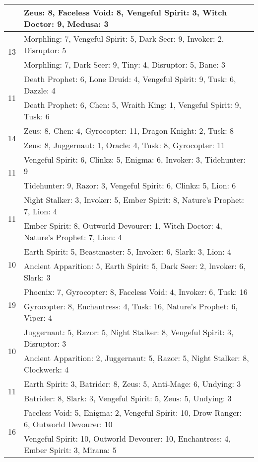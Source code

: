 \documentclass[result.tex]{subfiles}
\begin{document}
\begin{table}[H]
\begin{tabular}{ | c | p{12.5cm} | }
    & Zeus: 8, Faceless Void: 8, Vengeful Spirit: 3, Witch Doctor: 9, Medusa: 3 \\
    \hline
    \multirow{2}{*}{13}
    & Morphling: 7, Vengeful Spirit: 5, Dark Seer: 9, Invoker: 2, Disruptor: 5 \\
    & Morphling: 7, Dark Seer: 9, Tiny: 4, Disruptor: 5, Bane: 3 \\
    \hline
    \multirow{2}{*}{11}
    & Death Prophet: 6, Lone Druid: 4, Vengeful Spirit: 9, Tusk: 6, Dazzle: 4 \\
    & Death Prophet: 6, Chen: 5, Wraith King: 1, Vengeful Spirit: 9, Tusk: 6 \\
    \hline
    \multirow{2}{*}{14}
    & Zeus: 8, Chen: 4, Gyrocopter: 11, Dragon Knight: 2, Tusk: 8 \\
    & Zeus: 8, Juggernaut: 1, Oracle: 4, Tusk: 8, Gyrocopter: 11 \\
    \hline
    \multirow{2}{*}{11}
    & Vengeful Spirit: 6, Clinkz: 5, Enigma: 6, Invoker: 3, Tidehunter: 9 \\
    & Tidehunter: 9, Razor: 3, Vengeful Spirit: 6, Clinkz: 5, Lion: 6 \\
    \hline
    \multirow{2}{*}{11}
    & Night Stalker: 3, Invoker: 5, Ember Spirit: 8, Nature's Prophet: 7, Lion: 4 \\
    & Ember Spirit: 8, Outworld Devourer: 1, Witch Doctor: 4, Nature's Prophet: 7, Lion: 4 \\
    \hline
    \multirow{2}{*}{10}
    & Earth Spirit: 5, Beastmaster: 5, Invoker: 6, Slark: 3, Lion: 4 \\
    & Ancient Apparition: 5, Earth Spirit: 5, Dark Seer: 2, Invoker: 6, Slark: 3 \\
    \hline
    \multirow{2}{*}{19}
    & Phoenix: 7, Gyrocopter: 8, Faceless Void: 4, Invoker: 6, Tusk: 16 \\
    & Gyrocopter: 8, Enchantress: 4, Tusk: 16, Nature's Prophet: 6, Viper: 4 \\
    \hline
    \multirow{2}{*}{10}
    & Juggernaut: 5, Razor: 5, Night Stalker: 8, Vengeful Spirit: 3, Disruptor: 3 \\
    & Ancient Apparition: 2, Juggernaut: 5, Razor: 5, Night Stalker: 8, Clockwerk: 4 \\
    \hline
    \multirow{2}{*}{11}
    & Earth Spirit: 3, Batrider: 8, Zeus: 5, Anti-Mage: 6, Undying: 3 \\
    & Batrider: 8, Slark: 3, Vengeful Spirit: 5, Zeus: 5, Undying: 3 \\
    \hline
    \multirow{2}{*}{16}
    & Faceless Void: 5, Enigma: 2, Vengeful Spirit: 10, Drow Ranger: 6, Outworld Devourer: 10 \\
    & Vengeful Spirit: 10, Outworld Devourer: 10, Enchantress: 4, Ember Spirit: 3, Mirana: 5 \\
    \hline
  \end{tabular}
  \caption{}
  \label{}
\end{table}
\end{document}
